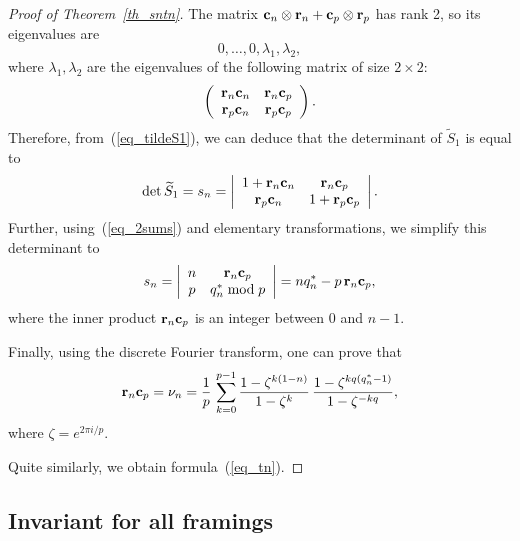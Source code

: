 \documentclass[pdftex]{sigma}
\begin{document}
\begin{proof}[Proof of Theorem~\ref{th_sntn}]
The matrix ${\bf c}_n \otimes {\bf r}_n + {\bf c}_p \otimes {\bf r}_p$ has rank 2, so its eigenvalues are
\begin{displaymath}
0, \ldots, 0, \lambda_1, \lambda_2,
\end{displaymath}
where $\lambda_1, \lambda_2$ are the eigenvalues of the following matrix of size $2\times 2$:
\begin{displaymath}
\left(
\begin{array}{cc}
{\bf r}_n {\bf c}_n & {\bf r}_n {\bf c}_p \\
{\bf r}_p {\bf c}_n & {\bf r}_p {\bf c}_p
\end{array} \right).
\end{displaymath}
Therefore, from~(\ref{eq_tildeS1}), we can deduce that the determinant of $\widetilde S_1$ is equal to
\begin{equation*}
\det \widetilde S_1 = s_n = \left|
\begin{array}{cc}
1 + {\bf r}_n {\bf c}_n & {\bf r}_n {\bf c}_p \\
{\bf r}_p {\bf c}_n & 1 + {\bf r}_p {\bf c}_p
\end{array} \right|.
\end{equation*}
Further, using~(\ref{eq_2sums}) and elementary transformations, we simplify this determinant to
\begin{displaymath}
s_n = \left|
\begin{array}{cc}
n & {\bf r}_n {\bf c}_p \\
p & q^*_n \bmod p
\end{array} \right| = n q^*_n - p \, {\bf r}_n {\bf c}_p,
\end{displaymath}
where the inner product ${\bf r}_n {\bf c}_p$ is an integer between $0$ and $n-1$.

Finally, using the discrete Fourier transform, one can prove that
\begin{displaymath}
{\bf r}_n {\bf c}_p = \nu_n = \frac{1}{p} \, \sum\limits_{k = 0}^{p-1} \frac{1 - \zeta^{k(1-n)}}{1 - \zeta^k} \, \frac{1 - \zeta^{kq(q^*_n-1)}}{1 - \zeta^{-kq}},
\end{displaymath}
where $\zeta = e^{2\pi i/p}$.

Quite similarly, we obtain formula~(\ref{eq_tn}).
\end{proof}


\subsection{Invariant for all framings}
\label{subsec_lens_framings}
\end{document}
